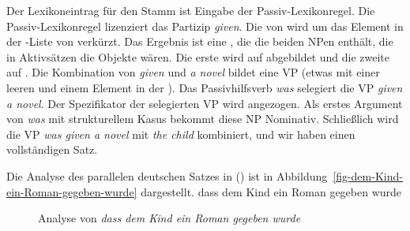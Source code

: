 \noindent
Der Lexikoneintrag für den Stamm  ist Eingabe der Passiv-Lexikonregel. Die Passiv-Lexikonregel
lizenziert das Partizip \emph{given}. Die \argst von  wird um das Element in
der \da-Liste von   verkürzt. Das Ergebnis ist eine \argstl, die die beiden NPen enthält, die in
Aktivsätzen die Objekte wären. Die erste  wird auf \spr abgebildet und die zweite 
auf \comps. Die Kombination von \emph{given} und \emph{a novel} bildet eine VP (etwas mit einer leeren
\compsl und einem Element in der \sprl). Das Passivhilfsverb \emph{was} selegiert die VP \emph{given a
  novel}.
Der Spezifikator der selegierten VP  wird angezogen. Als erstes Argument von
\emph{was} mit strukturellem Kasus bekommt diese NP Nominativ. Schließlich wird die VP \emph{was given a novel}
mit \emph{the child} kombiniert, und wir haben einen vollständigen Satz.

Die Analyse des parallelen deutschen Satzes in () ist in
Abbildung~\vref{fig-dem-Kind-ein-Roman-gegeben-wurde} dargestellt.
\ea
dass dem Kind ein Roman gegeben wurde
\z

\begin{figure}
\caption{\label{fig-dem-Kind-ein-Roman-gegeben-wurde}Analyse von \emph{dass dem Kind ein Roman gegeben
    wurde}}
\end{figure}

